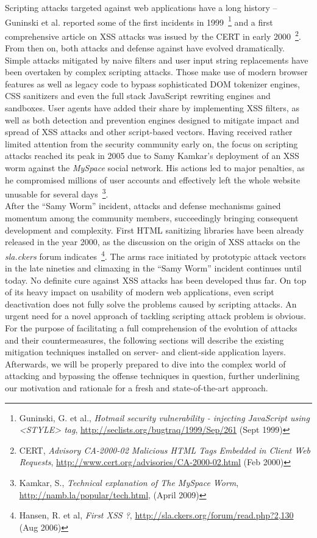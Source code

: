   Scripting attacks targeted against web applications have a long history -- Guninski et al. reported some of the first incidents in 1999~\footnote{Guninski, G. et al., \textit{Hotmail security vulnerability - injecting JavaScript using <STYLE> tag}, \url{http://seclists.org/bugtraq/1999/Sep/261} (Sept 1999)} and a first comprehensive article on XSS attacks was issued by the CERT in early 2000~\footnote{CERT, \textit{Advisory CA-2000-02 Malicious HTML Tags Embedded in Client Web Requests}, \url{http://www.cert.org/advisories/CA-2000-02.html} (Feb 2000)}. From then on, both attacks and defense against have evolved dramatically. Simple attacks mitigated by naive filters and user input string replacements have been overtaken by complex scripting attacks. Those make use of modern browser features as well as legacy code to bypass sophisticated DOM tokenizer engines, CSS sanitizers and even the full stack JavaScript rewriting engines and sandboxes. User agents have added their share by implementing XSS filters, as 
well as both detection and prevention engines designed to mitigate impact and spread of XSS attacks and other script-based vectors. Having received rather limited attention from the security community early on, the focus on scripting attacks reached its peak in 2005 due to Samy Kamkar's deployment of an XSS worm against the \textit{MySpace} social network. His actions led to major penalties, as he compromised millions of user accounts and effectively left the whole website unusable for several days~\footnote{Kamkar, S., \textit{Technical explanation of The MySpace Worm}, \url{http://namb.la/popular/tech.html}, (April 2009)}. \\

  After the ``Samy Worm'' incident, attacks and defense mechanisms gained momentum among the community members, succeedingly bringing consequent development and complexity. First HTML sanitizing libraries have been already released in the year 2000, as the discussion on the origin of XSS attacks on the \textit{sla.ckers} forum indicates~\footnote{Hansen, R. et al, \textit{First XSS ?}, \url{http://sla.ckers.org/forum/read.php?2,130} (Aug 2006)}. The arms race initiated by prototypic attack vectors in the late nineties and climaxing in the ``Samy Worm'' incident continues until today. No definite cure against XSS attacks has been developed thus far. On top of its heavy impact on usability of modern web applications, even script deactivation does not fully solve the problems caused by scripting attacks. An urgent need for a novel approach of tackling scripting attack problem is obvious. For the purpose of facilitating a full comprehension of the evolution of attacks and their countermeasures, the following 
sections will describe the existing mitigation techniques installed on server- and client-side application layers. Afterwards, we will be properly prepared to dive into the complex world of attacking and bypassing the offense techniques in question, further underlining our motivation and rationale for a fresh and state-of-the-art approach.

